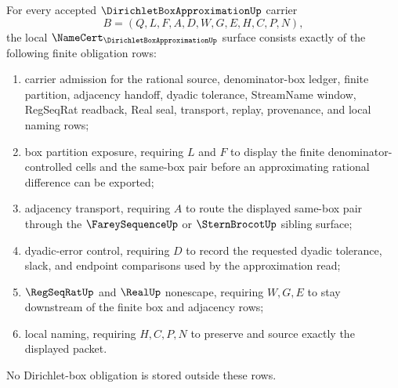 
\begin{theorem}
\label{thm:dirichlet-box-approximation-namecert-obligations}
For every accepted $\DirichletBoxApproximationUp$ carrier
$$
B=(Q,L,F,A,D,W,G,E,H,C,P,N),
$$
the local $\NameCert_{\DirichletBoxApproximationUp}$ surface consists exactly of the following finite obligation rows:
\begin{enumerate}
\item carrier admission for the rational source, denominator-box ledger, finite partition, adjacency handoff, dyadic tolerance, StreamName window, RegSeqRat readback, Real seal, transport, replay, provenance, and local naming rows;
\item box partition exposure, requiring $L$ and $F$ to display the finite denominator-controlled cells and the same-box pair before an approximating rational difference can be exported;
\item adjacency transport, requiring $A$ to route the displayed same-box pair through the $\FareySequenceUp$ or $\SternBrocotUp$ sibling surface;
\item dyadic-error control, requiring $D$ to record the requested dyadic tolerance, slack, and endpoint comparisons used by the approximation read;
\item $\RegSeqRatUp$ and $\RealUp$ nonescape, requiring $W,G,E$ to stay downstream of the finite box and adjacency rows;
\item local naming, requiring $H,C,P,N$ to preserve and source exactly the displayed packet.
\end{enumerate}
No Dirichlet-box obligation is stored outside these rows.
\end{theorem}
